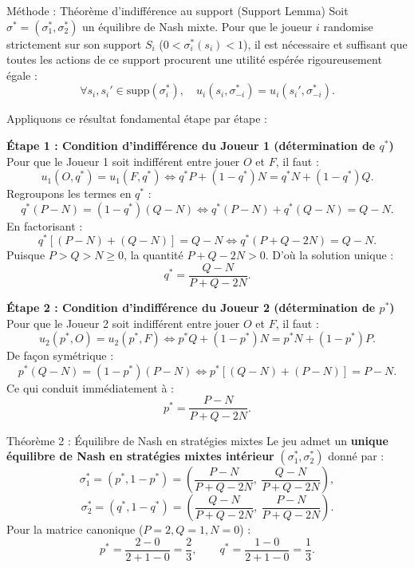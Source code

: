 \documentclass[11pt,a4paper]{article}
\begin{document}
\begin{methbox}{Méthode : Théorème d'indifférence au support (Support Lemma)}
Soit $\sigma^* = (\sigma_1^*, \sigma_2^*)$ un équilibre de Nash mixte. Pour que le joueur $i$ randomise strictement sur son support $S_i$ ($0 < \sigma_i^*(s_i) < 1$), il est nécessaire et suffisant que toutes les actions de ce support procurent une utilité espérée rigoureusement égale :
\[
\forall s_i, s_i' \in \mathrm{supp}(\sigma_i^*), \quad u_i(s_i, \sigma_{-i}^*) = u_i(s_i', \sigma_{-i}^*).
\]
\end{methbox}

Appliquons ce résultat fondamental étape par étape :

\textbf{Étape 1 : Condition d'indifférence du Joueur 1 (détermination de $q^*$)}
Pour que le Joueur 1 soit indifférent entre jouer $O$ et $F$, il faut :
\[
u_1(O, q^*) = u_1(F, q^*) \iff q^* P + (1-q^*) N = q^* N + (1-q^*) Q.
\]
Regroupons les termes en $q^*$ :
\[
q^* (P - N) = (1 - q^*) (Q - N) \iff q^* (P - N) + q^* (Q - N) = Q - N.
\]
En factorisant :
\[
q^* \left[ (P - N) + (Q - N) \right] = Q - N \iff q^* (P + Q - 2N) = Q - N.
\]
Puisque $P > Q > N \ge 0$, la quantité $P + Q - 2N > 0$. D'où la solution unique :
\begin{equation}\label{eq:qstar_formule}
\boxed{q^* = \frac{Q - N}{P + Q - 2N}}.
\end{equation}

\textbf{Étape 2 : Condition d'indifférence du Joueur 2 (détermination de $p^*$)}
Pour que le Joueur 2 soit indifférent entre jouer $O$ et $F$, il faut :
\[
u_2(p^*, O) = u_2(p^*, F) \iff p^* Q + (1-p^*) N = p^* N + (1-p^*) P.
\]
De façon symétrique :
\[
p^* (Q - N) = (1 - p^*) (P - N) \iff p^* \left[ (Q - N) + (P - N) \right] = P - N.
\]
Ce qui conduit immédiatement à :
\begin{equation}\label{eq:pstar_formule}
\boxed{p^* = \frac{P - N}{P + Q - 2N}}.
\end{equation}

\begin{propbox}{Théorème 2 : Équilibre de Nash en stratégies mixtes}
Le jeu admet un \textbf{unique équilibre de Nash en stratégies mixtes intérieur} $(\sigma_1^*, \sigma_2^*)$ donné par :
\begin{equation}
\sigma_1^* = \left( p^*, 1 - p^* \right) = \left( \frac{P - N}{P + Q - 2N}, \ \frac{Q - N}{P + Q - 2N} \right),
\end{equation}
\begin{equation}
\sigma_2^* = \left( q^*, 1 - q^* \right) = \left( \frac{Q - N}{P + Q - 2N}, \ \frac{P - N}{P + Q - 2N} \right).
\end{equation}
Pour la matrice canonique ($P = 2, Q = 1, N = 0$) :
\begin{equation}
p^* = \frac{2 - 0}{2 + 1 - 0} = \frac{2}{3}, \qquad q^* = \frac{1 - 0}{2 + 1 - 0} = \frac{1}{3}.
\end{equation}
\end{propbox}
\end{document}
